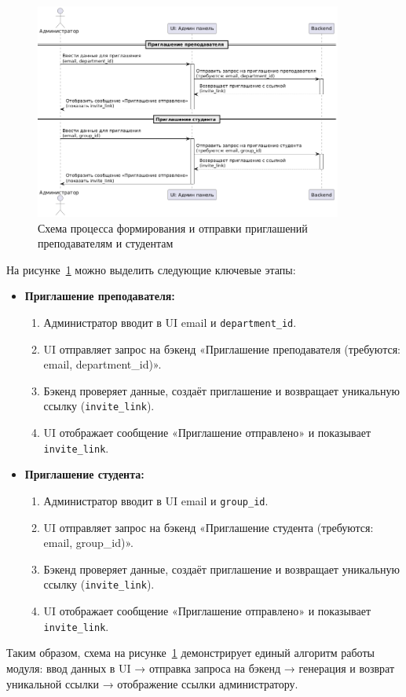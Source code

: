 \begin{figure}[H]
    \centering
    \includegraphics[width=0.9\textwidth]{static/diagrams/Admin.png}
    \caption{Схема процесса формирования и отправки приглашений преподавателям и студентам}
    \label{fig:admin-invite}
\end{figure}

На рисунке~\ref{fig:admin-invite} можно выделить следующие ключевые этапы:

\begin{itemize}
    \item \textbf{Приглашение преподавателя:}
    \begin{enumerate}
        \item Администратор вводит в UI email и \texttt{department\_id}.
        \item UI отправляет запрос на бэкенд «Приглашение преподавателя (требуются: email, department\_id)».
        \item Бэкенд проверяет данные, создаёт приглашение и возвращает уникальную ссылку (\texttt{invite\_link}).
        \item UI отображает сообщение «Приглашение отправлено» и показывает \texttt{invite\_link}.
    \end{enumerate}
    \item \textbf{Приглашение студента:}
    \begin{enumerate}
        \item Администратор вводит в UI email и \texttt{group\_id}.
        \item UI отправляет запрос на бэкенд «Приглашение студента (требуются: email, group\_id)».
        \item Бэкенд проверяет данные, создаёт приглашение и возвращает уникальную ссылку (\texttt{invite\_link}).
        \item UI отображает сообщение «Приглашение отправлено» и показывает \texttt{invite\_link}.
    \end{enumerate}
\end{itemize}

Таким образом, схема на рисунке~\ref{fig:admin-invite} демонстрирует единый алгоритм работы модуля: ввод данных в UI → отправка запроса на бэкенд → генерация и возврат уникальной ссылки → отображение ссылки администратору.
